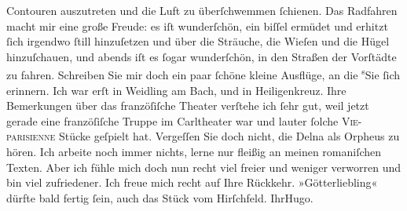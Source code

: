 \begin{ledgroupsized}[t]{13cm}
                    Contouren auszutreten und die Luft zu überſchwemmen ſchienen. Das Radfahren
                    macht mir eine große Freude: es iſt wunderſchön, ein biſſel ermüdet und erhitzt
                    ſich irgendwo ſtill hinzuſetzen {\pb}und über die Sträuche, die
                    Wieſen und die Hügel hinzuſchauen, und abends iſt es ſogar wunderſchön, in den
                    Straßen der Vorſtädte zu fahren.\pend
           \pstart
           Schreiben Sie mir doch ein paar ſchöne kleine Ausflüge, an die \substVorne{}\textsuperscript{s}\substDazwischen{}S\substHinten{}ie ſich erinnern. Ich war erſt in Weidling
                        am Bach, und in Heiligenkreuz.\pend
           \pstart
           Ihre Bemerkungen über das franzöſiſche Theater
                    verſtehe ich ſehr gut, weil jetzt gerade {\pb}eine franzöſiſche Truppe im Carltheater war und lauter ſolche \textsc{Vie-parisienne}{ }Stücke geſpielt hat. Vergeſſen Sie doch nicht,
                    die Delna als Orpheus zu hören.\pend
           \pstart
           Ich arbeite noch immer nichts, lerne nur fleißig an meinen romaniſchen Texten.
                    Aber ich fühle mich doch nun recht viel freier und weniger verworren und bin
                    viel zufriedener.\pend
           \pstart
           Ich freue mich recht auf Ihre Rückkehr. »Götterliebling« dürfte bald fertig ſein, auch das Stück vom Hirſchfeld.\pend
           \pstart Ihr\spacefill\mbox{Hugo.}\pend{}\endnumbering{}\end{ledgroupsized}  \newcommand{\dateiname}{L00673}\newcommand{\titel}{Hugo von Hofmannsthal an Arthur Schnitzler, 2. 5. [1897]}\newcommand{\editorInnen}{Martin Anton Müller und Gerd-Hermann Susen}
      